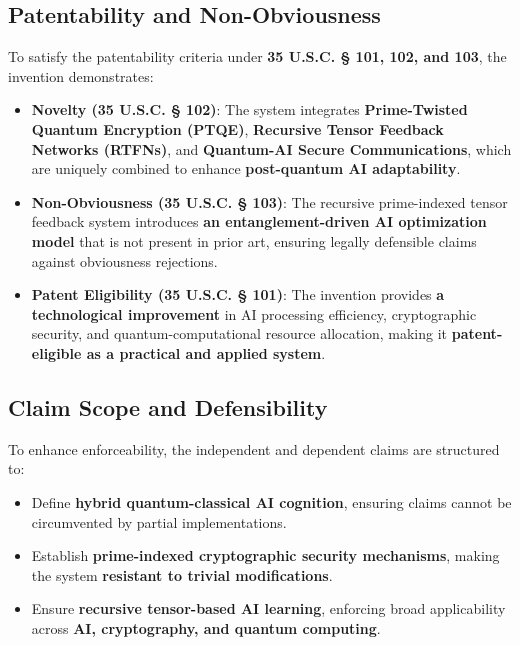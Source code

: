 \documentclass{article}
\theoremstyle{plain}
\begin{document}
\begin{itemize}
\subsection{Patentability and Non-Obviousness}
To satisfy the patentability criteria under \textbf{35 U.S.C. § 101, 102, and 103}, the invention demonstrates:
\begin{itemize}
    \item \textbf{Novelty (35 U.S.C. § 102)}: The system integrates \textbf{Prime-Twisted Quantum Encryption (PTQE)}, \textbf{Recursive Tensor Feedback Networks (RTFNs)}, and \textbf{Quantum-AI Secure Communications}, which are uniquely combined to enhance \textbf{post-quantum AI adaptability}.
    \item \textbf{Non-Obviousness (35 U.S.C. § 103)}: The recursive prime-indexed tensor feedback system introduces \textbf{an entanglement-driven AI optimization model} that is not present in prior art, ensuring legally defensible claims against obviousness rejections.
    \item \textbf{Patent Eligibility (35 U.S.C. § 101)}: The invention provides \textbf{a technological improvement} in AI processing efficiency, cryptographic security, and quantum-computational resource allocation, making it \textbf{patent-eligible as a practical and applied system}.
\end{itemize}

\subsection{Claim Scope and Defensibility}
To enhance enforceability, the independent and dependent claims are structured to:
\begin{itemize}
    \item Define \textbf{hybrid quantum-classical AI cognition}, ensuring claims cannot be circumvented by partial implementations.
    \item Establish \textbf{prime-indexed cryptographic security mechanisms}, making the system \textbf{resistant to trivial modifications}.
    \item Ensure \textbf{recursive tensor-based AI learning}, enforcing broad applicability across \textbf{AI, cryptography, and quantum computing}.
\end{itemize}


\end{itemize}
\end{document}
